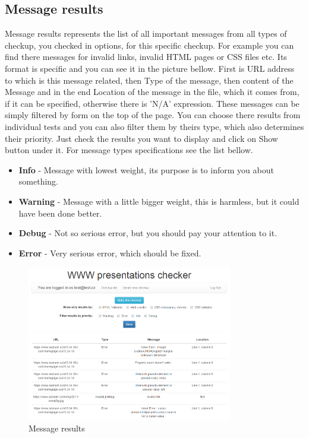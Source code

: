 \documentclass[12pt,a4paper]{article}
\begin{document}
\subsection{Message results} \label{messages}
Message results represents the list of all important messages from all types of checkup, you checked in options, for this specific checkup. For example you can find there messages for invalid links, invalid HTML pages or CSS files etc. Its format is specific and you can see it in the picture bellow. First is URL address to which is this message related, then Type of the message, then content of the Message and in the end Location of the message in the file, which it comes from, if it can be specified, otherwise there is 'N/A' expression. These messages can be simply filtered by form on the top of the page. You can choose there results from individual tests and you can also filter them by theirs type, which also determines their priority. Just check the results you want to display and click on Show button under it. For message types specifications see the list bellow.
\begin{itemize}
	\item \textbf{Info} - Message with lowest weight, its purpose is to inform you about something.
	\item \textbf{Warning} - Message with a little bigger weight, this is harmless, but it could have been done better.
	\item \textbf{Debug} - Not so serious error, but you should pay your attention to it.
	\item \textbf{Error} - Very serious error, which should be fixed.
\end{itemize}

\begin{figure}[H]
    \centering
    \includegraphics[width=0.8\textwidth]{pictures/messages.png}
		\caption{Message results}
		\label{fig:messages}
\end{figure}
\end{document}
